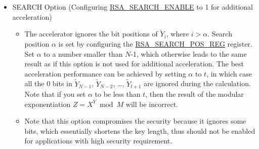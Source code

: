 \documentclass[main\_\_EN.tex]{subfiles}
\begin{document}
\begin{itemize}
 \item SEARCH Option (Configuring \hyperref[regdesc:RSASEARCHENABLEREG]{RSA\_SEARCH\_ENABLE} to 1 for additional acceleration)
    \begin{itemize}
        \item The accelerator ignores the bit positions of \begin{math} \widetilde{Y}_{i} \end{math}, where \begin{math} i > \alpha \end{math}. Search position \begin{math} \alpha \end{math} is set by configuring the \hyperref[regdesc:RSASEARCHPOSREG]{RSA\_SEARCH\_POS\_REG} register. Set \begin{math} \alpha \end{math} to a number smaller than \begin{math}N\end{math}-1, which otherwise leads to the same result as if this option is not used for additional acceleration. The best acceleration performance can be achieved by setting \begin{math} \alpha \end{math} to \begin{math} t \end{math}, in which case all the 0 bits in \begin{math}\widetilde{Y}_{N-1}\end{math}, \begin{math}\widetilde{Y}_{N-2}\end{math}, \dots, \begin{math}\widetilde{Y}_{t+1}\end{math} are ignored during the calculation. Note that if you set \begin{math} \alpha \end{math} to be less than \begin{math} t \end{math}, then the result of the modular exponentiation \begin{math}Z = X^{Y} \bmod M \end{math} will be incorrect.%
    \item Note that this option compromises the security because it ignores some bits, which essentially shortens the key length, thus should not be enabled for applications with high security requirement.
    \end{itemize}


\end{itemize}
\end{document}
